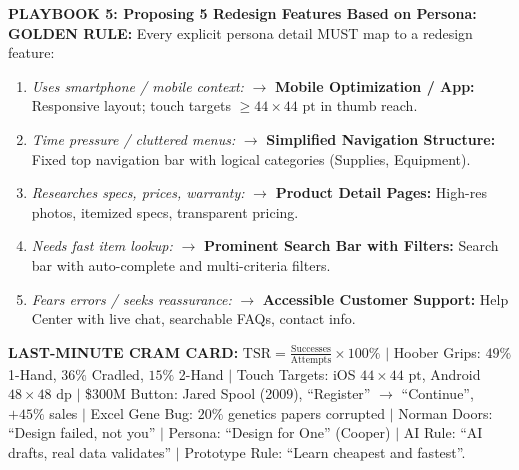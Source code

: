 \documentclass[8.5pt,a4paper,twocolumn]{article}
\begin{document}
\begin{miniplaybook}
\vspace{1pt}
\textbf{PLAYBOOK 5: Proposing 5 Redesign Features Based on Persona:}
\textbf{GOLDEN RULE:} Every explicit persona detail MUST map to a redesign feature:
\begin{enumerate}[leftmargin=10pt, itemsep=0.5pt]
    \item \textit{Uses smartphone / mobile context:} $\rightarrow$ \textbf{Mobile Optimization / App:} Responsive layout; touch targets $\ge 44\times 44\text{ pt}$ in thumb reach.
    \item \textit{Time pressure / cluttered menus:} $\rightarrow$ \textbf{Simplified Navigation Structure:} Fixed top navigation bar with logical categories (Supplies, Equipment).
    \item \textit{Researches specs, prices, warranty:} $\rightarrow$ \textbf{Product Detail Pages:} High-res photos, itemized specs, transparent pricing.
    \item \textit{Needs fast item lookup:} $\rightarrow$ \textbf{Prominent Search Bar with Filters:} Search bar with auto-complete and multi-criteria filters.
    \item \textit{Fears errors / seeks reassurance:} $\rightarrow$ \textbf{Accessible Customer Support:} Help Center with live chat, searchable FAQs, contact info.
\end{enumerate}
\end{miniplaybook}

\vspace{1pt}
\begin{crambox}
\tiny
\textbf{LAST-MINUTE CRAM CARD:} 
$\text{TSR} = \frac{\text{Successes}}{\text{Attempts}} \times 100\%$ $\vert$ 
Hoober Grips: $49\%$ 1-Hand, $36\%$ Cradled, $15\%$ 2-Hand $\vert$ 
Touch Targets: iOS $44\times 44\text{ pt}$, Android $48\times 48\text{ dp}$ $\vert$ 
\$300M Button: Jared Spool (2009), ``Register'' $\to$ ``Continue'', $+45\%$ sales $\vert$ 
Excel Gene Bug: $20\%$ genetics papers corrupted $\vert$ 
Norman Doors: ``Design failed, not you'' $\vert$ 
Persona: ``Design for One'' (Cooper) $\vert$ 
AI Rule: ``AI drafts, real data validates'' $\vert$ 
Prototype Rule: ``Learn cheapest and fastest''.
\end{crambox}
\end{document}
